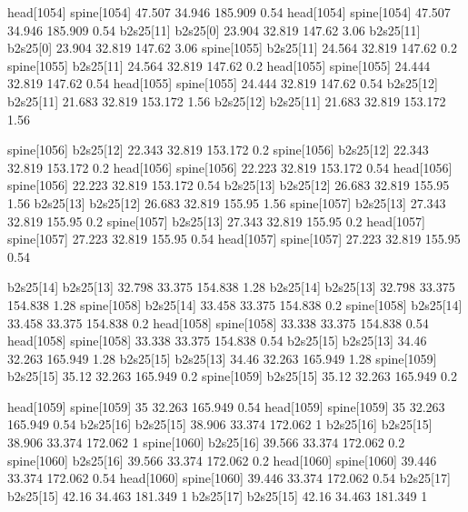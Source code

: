 head[1054]    spine[1054]    47.507    34.946    185.909    0.54
head[1054]    spine[1054]    47.507    34.946    185.909    0.54
b2s25[11]    b2s25[0]    23.904    32.819    147.62    3.06
b2s25[11]    b2s25[0]    23.904    32.819    147.62    3.06
spine[1055]    b2s25[11]    24.564    32.819    147.62    0.2
spine[1055]    b2s25[11]    24.564    32.819    147.62    0.2
head[1055]    spine[1055]    24.444    32.819    147.62    0.54
head[1055]    spine[1055]    24.444    32.819    147.62    0.54
b2s25[12]    b2s25[11]    21.683    32.819    153.172    1.56
b2s25[12]    b2s25[11]    21.683    32.819    153.172    1.56


spine[1056]    b2s25[12]    22.343    32.819    153.172    0.2
spine[1056]    b2s25[12]    22.343    32.819    153.172    0.2
head[1056]    spine[1056]    22.223    32.819    153.172    0.54
head[1056]    spine[1056]    22.223    32.819    153.172    0.54
b2s25[13]    b2s25[12]    26.683    32.819    155.95    1.56
b2s25[13]    b2s25[12]    26.683    32.819    155.95    1.56
spine[1057]    b2s25[13]    27.343    32.819    155.95    0.2
spine[1057]    b2s25[13]    27.343    32.819    155.95    0.2
head[1057]    spine[1057]    27.223    32.819    155.95    0.54
head[1057]    spine[1057]    27.223    32.819    155.95    0.54


b2s25[14]    b2s25[13]    32.798    33.375    154.838    1.28
b2s25[14]    b2s25[13]    32.798    33.375    154.838    1.28
spine[1058]    b2s25[14]    33.458    33.375    154.838    0.2
spine[1058]    b2s25[14]    33.458    33.375    154.838    0.2
head[1058]    spine[1058]    33.338    33.375    154.838    0.54
head[1058]    spine[1058]    33.338    33.375    154.838    0.54
b2s25[15]    b2s25[13]    34.46    32.263    165.949    1.28
b2s25[15]    b2s25[13]    34.46    32.263    165.949    1.28
spine[1059]    b2s25[15]    35.12    32.263    165.949    0.2
spine[1059]    b2s25[15]    35.12    32.263    165.949    0.2


head[1059]    spine[1059]    35    32.263    165.949    0.54
head[1059]    spine[1059]    35    32.263    165.949    0.54
b2s25[16]    b2s25[15]    38.906    33.374    172.062    1
b2s25[16]    b2s25[15]    38.906    33.374    172.062    1
spine[1060]    b2s25[16]    39.566    33.374    172.062    0.2
spine[1060]    b2s25[16]    39.566    33.374    172.062    0.2
head[1060]    spine[1060]    39.446    33.374    172.062    0.54
head[1060]    spine[1060]    39.446    33.374    172.062    0.54
b2s25[17]    b2s25[15]    42.16    34.463    181.349    1
b2s25[17]    b2s25[15]    42.16    34.463    181.349    1


